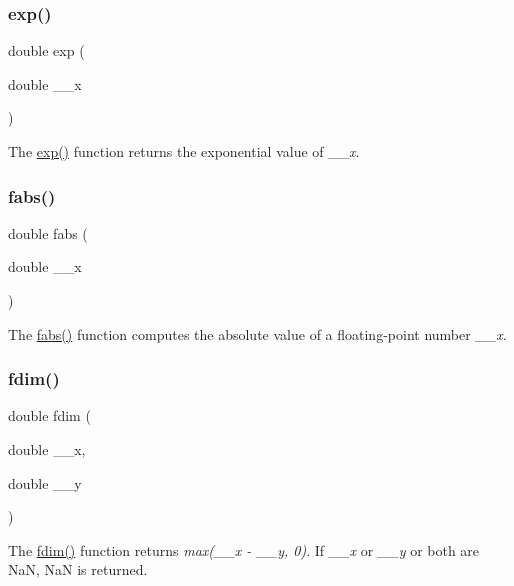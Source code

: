 \subsubsection{\texorpdfstring{exp()}{exp()}}
{\footnotesize\ttfamily double exp (\begin{DoxyParamCaption}\item[{double}]{\+\_\+\+\_\+x }\end{DoxyParamCaption})}

The \hyperlink{group__avr__math_gab7e32d20a0c6089375c9a088e819d1fb}{exp()} function returns the exponential value of {\itshape \+\_\+\+\_\+x}. \mbox{\label{group__avr__math_ga8045a0b219052cc0e90e74d07925f2b0}} 
\subsubsection{\texorpdfstring{fabs()}{fabs()}}
{\footnotesize\ttfamily double fabs (\begin{DoxyParamCaption}\item[{double}]{\+\_\+\+\_\+x }\end{DoxyParamCaption})}

The \hyperlink{group__avr__math_ga8045a0b219052cc0e90e74d07925f2b0}{fabs()} function computes the absolute value of a floating-\/point number {\itshape \+\_\+\+\_\+x}. \mbox{\label{group__avr__math_ga83281f9f08e93c6c388623d225ab3096}} 
\subsubsection{\texorpdfstring{fdim()}{fdim()}}
{\footnotesize\ttfamily double fdim (\begin{DoxyParamCaption}\item[{double}]{\+\_\+\+\_\+x,  }\item[{double}]{\+\_\+\+\_\+y }\end{DoxyParamCaption})}

The \hyperlink{group__avr__math_ga83281f9f08e93c6c388623d225ab3096}{fdim()} function returns {\itshape max(\+\_\+\+\_\+x -\/ \+\_\+\+\_\+y, 0)}. If {\itshape \+\_\+\+\_\+x} or {\itshape \+\_\+\+\_\+y} or both are NaN, NaN is returned. \mbox{\label{group__avr__math_ga4fdf30fdaae0cbccc44343184457464d}} 
